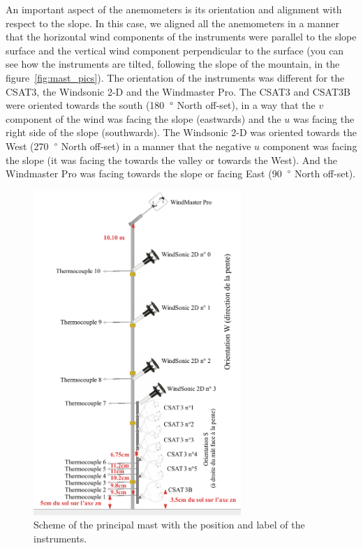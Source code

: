 An important aspect of the anemometers is its orientation and alignment with respect to the slope. In this case, we aligned all the anemometers in a manner that the horizontal wind components of the instruments were parallel to the slope surface and the vertical wind component perpendicular to the surface (you can see how the instruments are tilted, following the slope of the mountain, in the figure~\ref{fig:mast_pics}). The orientation of the instruments was different for the CSAT3, the Windsonic 2-D and the Windmaster Pro. The CSAT3 and CSAT3B were oriented towards the south (180~$\degree$ North off-set), in a way that the $v$ component of the wind was facing the slope (eastwards) and the $u$ was facing the right side of the slope (southwards). The Windsonic 2-D was oriented towards the West (270~$\degree$ North off-set) in a manner that the negative $u$ component was facing the slope (it was facing the towards the valley or towards the West). And the Windmaster Pro was facing towards the slope or facing East (90~$\degree$ North off-set).

\begin{figure}[!ht]
  \begin{center}
  \includegraphics[width=0.7\textwidth]{fig/chapter_3/Montage_J1.png}
  \caption{Scheme of the principal mast with the position and label of the instruments.}
  \label{fig:mast}
  \end{center}
\end{figure}

